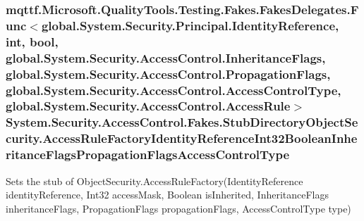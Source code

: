 \hypertarget{class_system_1_1_security_1_1_access_control_1_1_fakes_1_1_stub_directory_object_security_a1e0d2cf6b3b64f66196d9aefeb5da5fe}{
\subsubsection[{Access\-Rule\-Factory\-Identity\-Reference\-Int32\-Boolean\-Inheritance\-Flags\-Propagation\-Flags\-Access\-Control\-Type}]{\setlength{\rightskip}{0pt plus 5cm}mqttf.\-Microsoft.\-Quality\-Tools.\-Testing.\-Fakes.\-Fakes\-Delegates.\-Func$<$global.\-System.\-Security.\-Principal.\-Identity\-Reference, int, bool, global.\-System.\-Security.\-Access\-Control.\-Inheritance\-Flags, global.\-System.\-Security.\-Access\-Control.\-Propagation\-Flags, global.\-System.\-Security.\-Access\-Control.\-Access\-Control\-Type, global.\-System.\-Security.\-Access\-Control.\-Access\-Rule$>$ System.\-Security.\-Access\-Control.\-Fakes.\-Stub\-Directory\-Object\-Security.\-Access\-Rule\-Factory\-Identity\-Reference\-Int32\-Boolean\-Inheritance\-Flags\-Propagation\-Flags\-Access\-Control\-Type}}\label{class_system_1_1_security_1_1_access_control_1_1_fakes_1_1_stub_directory_object_security_a1e0d2cf6b3b64f66196d9aefeb5da5fe}


Sets the stub of Object\-Security.\-Access\-Rule\-Factory(\-Identity\-Reference identity\-Reference, Int32 access\-Mask, Boolean is\-Inherited, Inheritance\-Flags inheritance\-Flags, Propagation\-Flags propagation\-Flags, Access\-Control\-Type type)

